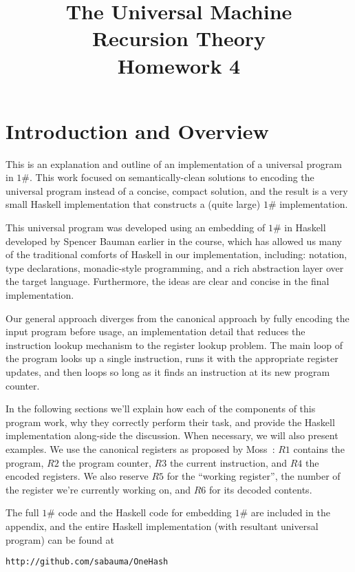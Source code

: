 \documentclass[10pt, preprint, nocopyrightspace]{sigplanconf}
\title{The Universal \oh Machine\\\large Recursion Theory\\ Homework 4}
\newcommand{\oh}{$1\#$\xspace}
\begin{document}
\maketitle

\section{Introduction and Overview}

This is an explanation and outline of an implementation of a universal program
in \oh. This work focused on semantically-clean solutions to encoding the universal
program instead of a concise, compact solution, and the result is a very small
Haskell implementation that constructs a (quite large) \oh implementation.

This universal program was developed using an embedding of \oh in Haskell
developed by Spencer Bauman earlier in the course, which has allowed us many of the
traditional comforts of Haskell in our implementation, including: notation, type
declarations, monadic-style programming, and a rich abstraction layer over the
target language. Furthermore, the ideas are clear and concise in the final
implementation.

Our general approach diverges from the canonical approach by fully encoding the input
program before usage, an implementation detail that reduces the instruction
lookup mechanism to the register lookup problem. The main loop of the program 
looks up a single instruction, runs it with the appropriate register updates,
and then loops so long as it finds an instruction at its new program counter.

In the following sections we’ll explain how each of the components of this
program work, why they correctly perform their task, and provide the Haskell
implementation along-side the discussion. When necessary, we will also present
examples. 
We use the canonical registers as proposed by Moss~\cite{moss}: $R1$ contains the
program,
$R2$ the program counter, $R3$ the current instruction, and
$R4$ the encoded registers. We also reserve $R5$ for the ``working register'',
the number of the register we're currently working on, and $R6$ for its decoded
contents.



The full \oh code and the Haskell code for embedding \oh are included in the
appendix, and the entire Haskell implementation (with resultant universal
program) can be found at 
\begin{center}
\lstinline{http://github.com/sabauma/OneHash}
\end{center}
\end{document}
